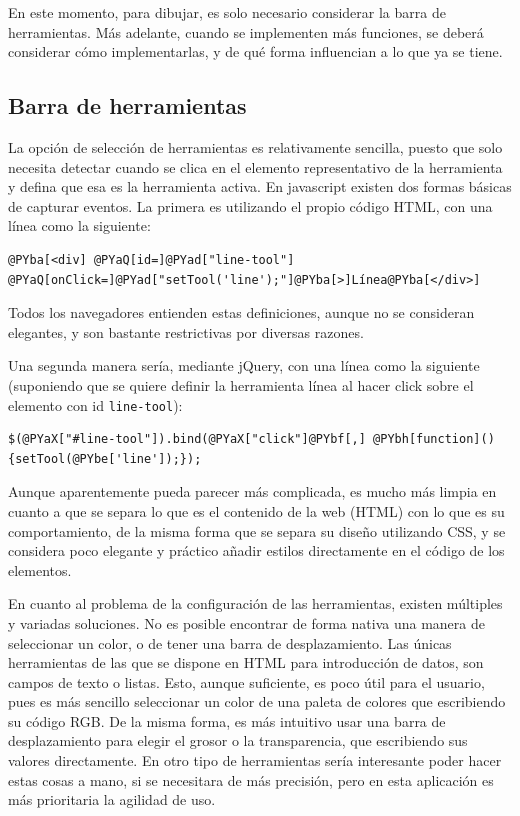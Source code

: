 En este momento, para dibujar, es solo necesario considerar la barra de herramientas. Más adelante, cuando se implementen más funciones, se deberá considerar cómo implementarlas, y de qué forma influencian a lo que ya se tiene.

\subsection{Barra de herramientas} %
\label{sub:barra_de_herramientas}

La opción de selección de herramientas es relativamente sencilla, puesto que solo necesita detectar cuando se clica en el elemento representativo de la herramienta y defina que esa es la herramienta activa. En javascript existen dos formas básicas de capturar eventos. La primera es utilizando el propio código HTML, con una línea como la siguiente:
\begin{Verbatim}[commandchars=@\[\]]
  @PYba[<div] @PYaQ[id=]@PYad["line-tool"] @PYaQ[onClick=]@PYad["setTool('line');"]@PYba[>]Línea@PYba[</div>]
\end{Verbatim}

Todos los navegadores entienden estas definiciones, aunque no se consideran elegantes, y son bastante restrictivas por diversas razones.

Una segunda manera sería, mediante jQuery, con una línea como la siguiente (suponiendo que se quiere definir la herramienta línea al hacer click sobre el elemento con id \texttt{line-tool}):
\begin{Verbatim}[commandchars=@\[\]]
  $(@PYaX["#line-tool"]).bind(@PYaX["click"]@PYbf[,] @PYbh[function](){setTool(@PYbe['line']);});
\end{Verbatim}

Aunque aparentemente pueda parecer más complicada, es mucho más limpia en cuanto a que se separa lo que es el contenido de la web (HTML) con lo que es su comportamiento, de la misma forma que se separa su diseño utilizando CSS, y se considera poco elegante y práctico añadir estilos directamente en el código de los elementos.

En cuanto al problema de la configuración de las herramientas, existen múltiples y variadas soluciones. No es posible encontrar de forma nativa una manera de seleccionar un color, o de tener una barra de desplazamiento. Las únicas herramientas de las que se dispone en HTML para introducción de datos, son campos de texto o listas. Esto, aunque suficiente, es poco útil para el usuario, pues es más sencillo seleccionar un color de una paleta de colores que escribiendo su código RGB. De la misma forma, es más intuitivo usar una barra de desplazamiento para elegir el grosor o la transparencia, que escribiendo sus valores directamente. En otro tipo de herramientas sería interesante poder hacer estas cosas a mano, si se necesitara de más precisión, pero en esta aplicación es más prioritaria la agilidad de uso.

